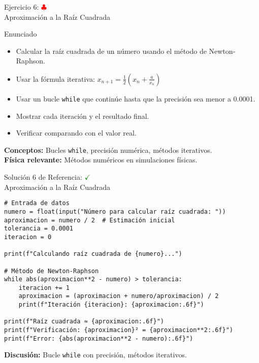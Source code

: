 \documentclass[10pt]{beamer}
\begin{document}
\begin{frame}{Ejercicio 6: \hfill \textcolor{red}{$\clubsuit$} \\ Aproximación a la Raíz Cuadrada}
  \begin{block}{Enunciado}
    \begin{itemize}
      \item Calcular la raíz cuadrada de un número usando el método de Newton-Raphson.
      \item Usar la fórmula iterativa: $x_{n+1} = \frac{1}{2}(x_n + \frac{a}{x_n})$
      \item Usar un bucle \texttt{while} que continúe hasta que la precisión sea menor a 0.0001.
      \item Mostrar cada iteración y el resultado final.
      \item Verificar comparando con el valor real.
    \end{itemize}
  \end{block}
  
  \textbf{Conceptos:} Bucles \texttt{while}, precisión numérica, métodos iterativos.
  \\
  \textbf{Física relevante:} Métodos numéricos en simulaciones físicas.
\end{frame}

\begin{frame}[fragile]{Solución 6 de Referencia: \hfill \textcolor{green}{$\checkmark$} \\ Aproximación a la Raíz Cuadrada}
\begin{verbatim}
# Entrada de datos
numero = float(input("Número para calcular raíz cuadrada: "))
aproximacion = numero / 2  # Estimación inicial
tolerancia = 0.0001
iteracion = 0

print(f"Calculando raíz cuadrada de {numero}...")

# Método de Newton-Raphson
while abs(aproximacion**2 - numero) > tolerancia:
    iteracion += 1
    aproximacion = (aproximacion + numero/aproximacion) / 2
    print(f"Iteración {iteracion}: {aproximacion:.6f}")

print(f"Raíz cuadrada ≈ {aproximacion:.6f}")
print(f"Verificación: {aproximacion}² = {aproximacion**2:.6f}")
print(f"Error: {abs(aproximacion**2 - numero):.6f}")
\end{verbatim}
\textbf{Discusión:} Bucle \texttt{while} con precisión, métodos iterativos.
\end{frame}
\end{document}

